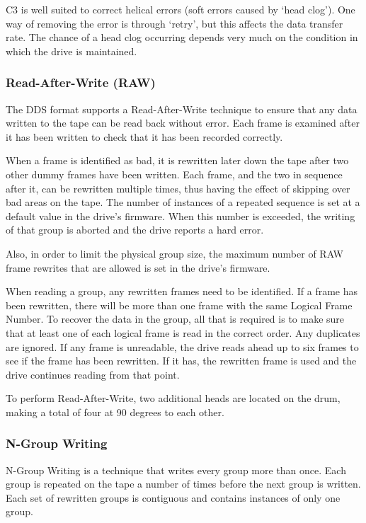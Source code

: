 \documentclass[11pt]{article}
\begin{document}
C3 is well suited to correct helical errors (soft errors caused by `head
clog'). One way of removing the error is through `retry', but this affects
the data transfer rate. The chance of a head clog occurring depends very
much on the condition in which the drive is maintained.

\subsubsection {Read-After-Write (RAW)}

The DDS format supports a Read-After-Write technique to ensure that any data
written to the tape can be read back without error. Each frame is examined
after it has been written to check that it has been recorded correctly.

When a frame is identified as bad, it is rewritten later down the tape
after two other dummy frames have been written. Each frame, and the two in
sequence after it, can be rewritten multiple times, thus having the effect
of skipping over bad areas on the tape. The number of instances of a
repeated sequence is set at a default value in the drive's firmware. When
this number is exceeded, the writing of that group is aborted and the drive
reports a hard error.

Also, in order to limit the physical group size, the maximum number of RAW
frame rewrites that are allowed is set in the drive's firmware.

When reading a group, any rewritten frames need to be identified. If a
frame has been rewritten, there will be more than one frame with the same
Logical Frame Number. To recover the data in the group, all that is required
is to make sure that at least one of each logical frame is read in the
correct order. Any duplicates are ignored. If any frame is unreadable, the
drive reads ahead up to six frames to see if the frame has been rewritten.
If it has, the rewritten frame is used and the drive continues reading from
that point.

To perform Read-After-Write, two additional heads are located on the drum,
making a total of four at 90 degrees to each other.

\subsubsection {N-Group Writing}

N-Group Writing is a technique that writes every group more than once. Each
group is repeated on the tape a number of times before the next group is
written. Each set of rewritten groups is contiguous and contains instances
of only one group.
\end{document}
